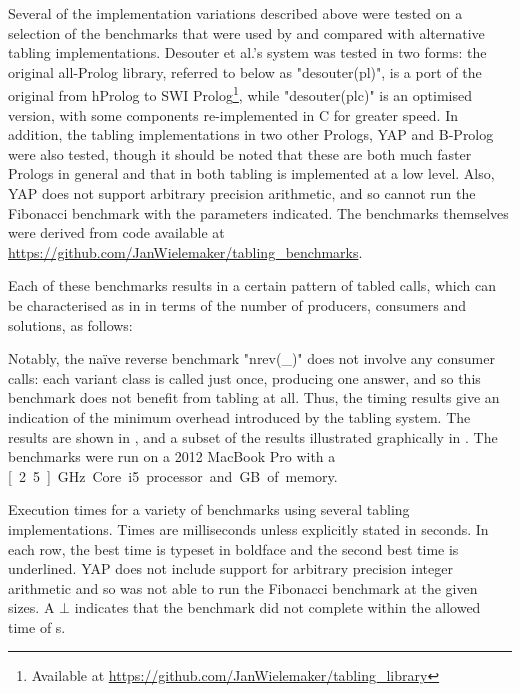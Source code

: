 Several of the implementation variations described above were tested on a selection
of the benchmarks that were used by \cite{DesouterVan-DoorenSchrijvers2015} and
compared with alternative tabling implementations. 
Desouter et al.'s system was tested in two forms: the original all-Prolog
library, referred to below as "desouter(pl)", is a port of the original from hProlog to SWI Prolog\footnote{%
Available at \url{https://github.com/JanWielemaker/tabling_library}}, while
"desouter(plc)" is an optimised version, with some components re-implemented
in C for greater speed. In addition, the tabling implementations in two other Prologs,
YAP and B-Prolog were also tested, though it should be noted that these are both
much faster Prologs in general and that in both tabling is implemented at a low level.
Also, YAP does not support arbitrary precision arithmetic, and so cannot run the Fibonacci benchmark
with the parameters indicated.
The benchmarks themselves were derived from code available at \url{https://github.com/JanWielemaker/tabling_benchmarks}.

Each of these benchmarks results in a certain pattern of tabled calls, which can be characterised
as in  in terms of the number of producers, consumers and solutions, as follows:
\begin{center}
  
\end{center}
Notably, the na\"ive reverse benchmark "nrev(_)" does not involve any consumer calls: each variant class
is called just once, producing one answer, and so this benchmark does not benefit from tabling at all.
Thus, the timing results give an indication of the minimum overhead introduced by the tabling system.
The results are shown in , and a subset of the results illustrated graphically in
. The benchmarks were run on a 2012 MacBook Pro with a \unit[2.5]{GHz} Core i5 processor and 
\unit[8]{GB} of memory.

\begin{table}
\small%
\begin{center}

\end{center}
\caption{Execution times for a variety of benchmarks using several tabling implementations.
Times are milliseconds unless explicitly stated in seconds. In each row, the best time
is typeset in boldface and the second best time is underlined. YAP does not include
support for arbitrary precision integer arithmetic and so was not able to run
the Fibonacci benchmark at the given sizes. A $\bot$ indicates that the benchmark
did not complete within the allowed time of \unit[240]{s}. }
\end{table}

